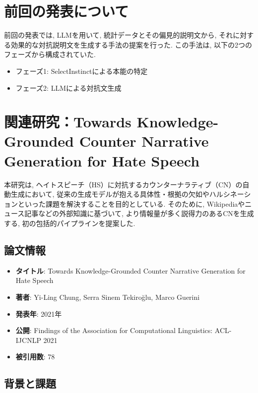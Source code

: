 \documentclass[dvipdfmx]{jsarticle}
\begin{document}
\section{前回の発表について}

前回の発表では, LLMを用いて, 統計データとその偏見的説明文から, それに対する効果的な対抗説明文を生成する手法の提案を行った.
この手法は, 以下の2つのフェーズから構成されていた.

\begin{itemize}
  \item フェーズ1: SelectInstinctによる本能の特定
  \item フェーズ2: LLMによる対抗文生成
\end{itemize}

\vspace{1em}

\section{関連研究：Towards Knowledge-Grounded Counter Narrative Generation for Hate Speech \cite{chung2021}}

本研究は, ヘイトスピーチ（HS）に対抗するカウンターナラティブ（CN）の自動生成において, 従来の生成モデルが抱える具体性・根拠の欠如やハルシネーションといった課題を解決することを目的としている.
そのために, Wikipediaやニュース記事などの外部知識に基づいて, より情報量が多く説得力のあるCNを生成する, 初の包括的パイプラインを提案した.

\subsection{論文情報}
\begin{itemize}
  \item \textbf{タイトル}: Towards Knowledge-Grounded Counter Narrative Generation for Hate Speech
  \item \textbf{著者}: Yi-Ling Chung, Serra Sinem Tekiroğlu, Marco Guerini
  \item \textbf{発表年}: 2021年
  \item \textbf{公開}: Findings of the Association for Computational Linguistics: ACL-IJCNLP 2021
  \item \textbf{被引用数}: 78
\end{itemize}

\vspace{0.5em}

\subsection{背景と課題}
\end{document}
